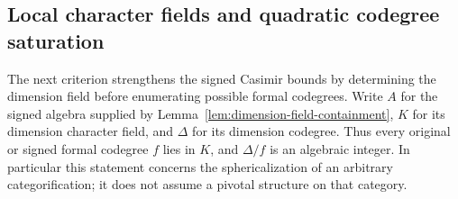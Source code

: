\subsection{Local character fields and quadratic codegree saturation}
\label{sec:r3-local-fields}

The next criterion strengthens the signed Casimir bounds by determining
the dimension field before enumerating possible formal codegrees.
Write $A$ for the signed algebra supplied by
Lemma~\ref{lem:dimension-field-containment}, $K$ for its dimension
character field, and $\Delta$ for its dimension codegree. Thus every
original or signed formal codegree $f$ lies in $K$, and
$\Delta/f$ is an algebraic integer. In particular this statement
concerns the sphericalization of an arbitrary categorification; it
does not assume a pivotal structure on that category.

